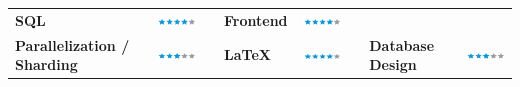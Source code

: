 \documentclass[]{friggeri-cv}
\begin{document}
\begin{table}[!h]
\begin{tabular}{L{3.25cm}cL{2cm}L{2.25cm}cL{2cm}L{2.25cm}c}
		\textbf{SQL} & \includegraphics[scale=0.4]{img/4stars.png}
		&&
		\textbf{Frontend} & \includegraphics[scale=0.40]{img/4stars.png} \\
		\textbf{Parallelization / Sharding} &
		\includegraphics[scale=0.40]{img/3stars.png} &&
		\textbf{\LaTeX} & \includegraphics[scale=0.4]{img/4stars.png}
		&&
		\textbf{Database Design}&
		\includegraphics[scale=0.40]{img/3stars.png}\\
	\end{tabular}
\end{table}
\vspace*{\fill}
\end{document}
